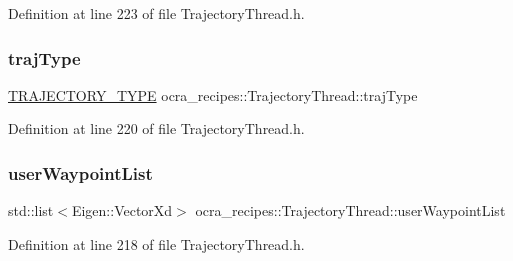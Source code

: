 Definition at line 223 of file Trajectory\+Thread.\+h.

\hypertarget{classocra__recipes_1_1TrajectoryThread_a1ed2999782ff98b02b5d99ac66766cd7}{}\label{classocra__recipes_1_1TrajectoryThread_a1ed2999782ff98b02b5d99ac66766cd7} 
\subsubsection{\texorpdfstring{traj\+Type}{trajType}}
{\footnotesize\ttfamily \hyperlink{namespaceocra__recipes_a729e1c8304e390d16219eda5f9756152}{T\+R\+A\+J\+E\+C\+T\+O\+R\+Y\+\_\+\+T\+Y\+PE} ocra\+\_\+recipes\+::\+Trajectory\+Thread\+::traj\+Type\hspace{0.3cm}{\ttfamily [protected]}}



Definition at line 220 of file Trajectory\+Thread.\+h.

\hypertarget{classocra__recipes_1_1TrajectoryThread_ab0d6ab656c8e4c7abd3bae0343b51562}{}\label{classocra__recipes_1_1TrajectoryThread_ab0d6ab656c8e4c7abd3bae0343b51562} 
\subsubsection{\texorpdfstring{user\+Waypoint\+List}{userWaypointList}}
{\footnotesize\ttfamily std\+::list$<$Eigen\+::\+Vector\+Xd$>$ ocra\+\_\+recipes\+::\+Trajectory\+Thread\+::user\+Waypoint\+List\hspace{0.3cm}{\ttfamily [protected]}}



Definition at line 218 of file Trajectory\+Thread.\+h.

\hypertarget{classocra__recipes_1_1TrajectoryThread_a54a762b3cdd7330322b39f288deda6a9}{}\label{classocra__recipes_1_1TrajectoryThread_a54a762b3cdd7330322b39f288deda6a9} 
